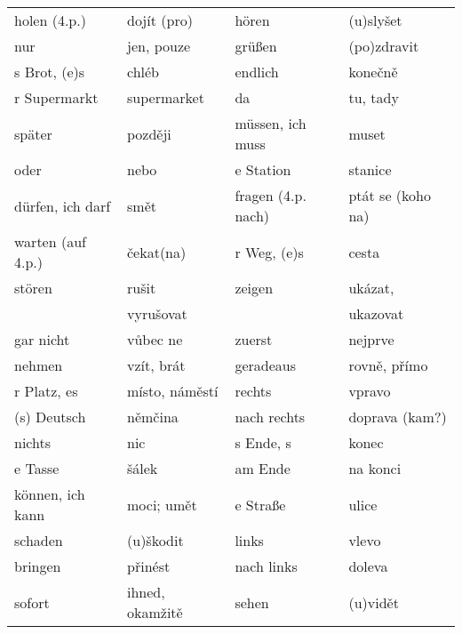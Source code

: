 \begin{table}[h]
\begin{tabular}{llll}
          holen (4.p.)  & dojít (pro)      & hören               & (u)slyšet             \\
          nur           & jen, pouze       & grüßen              & (po)zdravit           \\
          s Brot, (e)s  & chléb            & endlich             & konečně               \\
          r Supermarkt  & supermarket      & da                  & tu, tady              \\
          später        & později          & müssen, ich muss    & muset                 \\
          oder          & nebo             & e Station           & stanice               \\
          dürfen, ich darf   & smět        & fragen (4.p. nach)  & ptát se (koho na)     \\
          warten (auf 4.p.)  & čekat(na)   & r Weg, (e)s         & cesta                 \\
          stören        & rušit            & zeigen              & ukázat,               \\
                        & vyrušovat        &                     & ukazovat              \\
          gar nicht     & vůbec ne         & zuerst              & nejprve               \\
          nehmen        & vzít, brát       & geradeaus           & rovně, přímo          \\
          r Platz, es   & místo, náměstí   & rechts              & vpravo                \\
          (s) Deutsch   & němčina          & nach rechts         & doprava (kam?)        \\
          nichts        & nic              & s Ende, s           & konec                 \\
          e Tasse       & šálek            & am Ende             & na konci              \\
          können, ich kann   & moci; umět  & e Straße            & ulice                 \\
          schaden       & (u)škodit        & links               & vlevo                 \\ 
          bringen       & přinést          & nach links          & doleva                \\
          sofort        & ihned, okamžitě  & sehen               & (u)vidět              \\
        \hline       
      \end{tabular}
      \caption*{ }
    \end{table}
  
